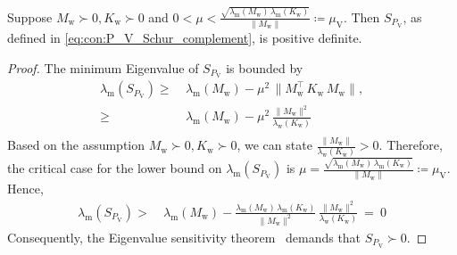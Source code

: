 \begin{lemma}\label{lemma:con:P_V_Schur_complement_positive_definite}
    Suppose $M_\mathrm{w} \succ 0, K_\mathrm{w} \succ 0$ and $0 < \mu < \frac{\sqrt{\lambda_\mathrm{m}(M_\mathrm{w}) \, \lambda_\mathrm{m}\left(K_\mathrm{w}\right)}}{\lVert M_\mathrm{w} \rVert} \coloneqq \mu_\mathrm{V}$. Then $S_{P_\mathrm{V}}$, as defined in \eqref{eq:con:P_V_Schur_complement}, is positive definite.
\end{lemma}
\begin{proof}
    The minimum Eigenvalue of $S_{P_\mathrm{V}}$ is bounded by
    \begin{equation}
    \begin{split}
        \lambda_\mathrm{m}(S_{P_\mathrm{V}}) \geq& \: \lambda_\mathrm{m}(M_\mathrm{w}) - \mu^2 \, \lVert M_\mathrm{w}^\top \, K_\mathrm{w} \, M_\mathrm{w} \rVert,\\
        \geq& \: \lambda_\mathrm{m}(M_\mathrm{w}) - \mu^2 \, \frac{\lVert M_\mathrm{w} \rVert^2}{\lambda_\mathrm{w} \left (K_\mathrm{w} \right )}\\
    \end{split}
    \end{equation}
    Based on the assumption $M_\mathrm{w} \succ 0, K_\mathrm{w} \succ 0$, we can state $\frac{\lVert M_\mathrm{w} \rVert}{\lambda_\mathrm{w}(K_\mathrm{w})} > 0$. Therefore, the critical case for the lower bound on $\lambda_\mathrm{m}(S_{P_\mathrm{V}})$ is $
    \mu = \frac{\sqrt{\lambda_\mathrm{m}(M_\mathrm{w}) \, \lambda_\mathrm{m}\left(K_\mathrm{w}\right)}}{\lVert M_\mathrm{w} \rVert} \coloneqq \mu_\mathrm{V}$. Hence,
    \begin{equation}
    \begin{split}
        \lambda_\mathrm{m}(S_{P_\mathrm{V}}) >& \: \lambda_\mathrm{m}(M_\mathrm{w}) - \frac{\lambda_\mathrm{m}(M_\mathrm{w}) \, \lambda_\mathrm{m}\left(K_\mathrm{w}\right)}{\lVert M_\mathrm{w} \rVert^2} \, \frac{\lVert M_\mathrm{w} \rVert^2}{\lambda_\mathrm{w}(K_\mathrm{w})} \: = \: 0
    \end{split}
    \end{equation}
    Consequently, the Eigenvalue sensitivity theorem~\citep{golub2013matrix} demands that $S_{P_\mathrm{V}} \succ 0$.
\end{proof}

